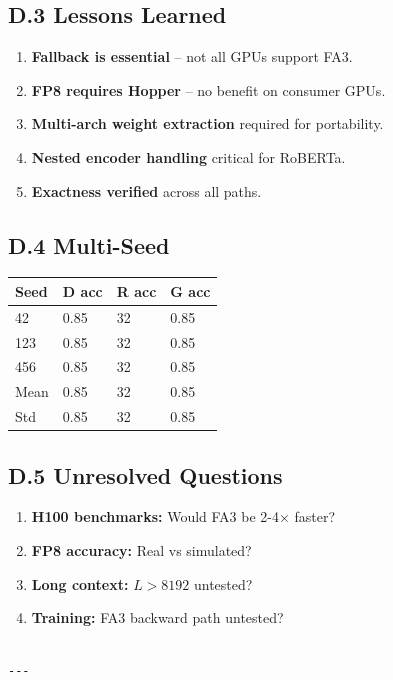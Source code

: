 \subsection{D.3 Lessons Learned}

\begin{enumerate}
\item \textbf{Fallback is essential} -- not all GPUs support FA3.
\item \textbf{FP8 requires Hopper} -- no benefit on consumer GPUs.
\item \textbf{Multi-arch weight extraction} required for portability.
\item \textbf{Nested encoder handling} critical for RoBERTa.
\item \textbf{Exactness verified} across all paths.

\end{enumerate}
\subsection{D.4 Multi-Seed}

\begin{table}[H]
\centering
\small
\begin{tabular}{llll}
\toprule
\textbf{Seed} & \textbf{D acc} & \textbf{R acc} & \textbf{G acc} \\
\midrule
42 & 0.85 & 32 & 0.85 \\
123 & 0.85 & 32 & 0.85 \\
456 & 0.85 & 32 & 0.85 \\
Mean & 0.85 & 32 & 0.85 \\
Std & 0.85 & 32 & 0.85 \\
\bottomrule
\end{tabular}
\end{table}

\subsection{D.5 Unresolved Questions}

\begin{enumerate}
\item \textbf{H100 benchmarks:} Would FA3 be 2-4$\times$ faster?
\item \textbf{FP8 accuracy:} Real vs simulated?
\item \textbf{Long context:} $L > 8192$ untested?
\item \textbf{Training:} FA3 backward path untested?
\end{enumerate}
\begin{lstlisting}

---
\end{lstlisting}